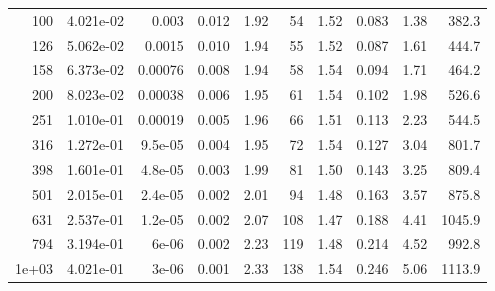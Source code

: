 \begin{tabular}{rrrrrrrrrr}
100 & 4.021e-02 & 0.003 & 0.012 & 1.92 & 54 & 1.52 & 0.083 & 1.38 & 382.3 \\
126 & 5.062e-02 & 0.0015 & 0.010 & 1.94 & 55 & 1.52 & 0.087 & 1.61 & 444.7 \\
158 & 6.373e-02 & 0.00076 & 0.008 & 1.94 & 58 & 1.54 & 0.094 & 1.71 & 464.2 \\
200 & 8.023e-02 & 0.00038 & 0.006 & 1.95 & 61 & 1.54 & 0.102 & 1.98 & 526.6 \\
251 & 1.010e-01 & 0.00019 & 0.005 & 1.96 & 66 & 1.51 & 0.113 & 2.23 & 544.5 \\
316 & 1.272e-01 & 9.5e-05 & 0.004 & 1.95 & 72 & 1.54 & 0.127 & 3.04 & 801.7 \\
398 & 1.601e-01 & 4.8e-05 & 0.003 & 1.99 & 81 & 1.50 & 0.143 & 3.25 & 809.4 \\
501 & 2.015e-01 & 2.4e-05 & 0.002 & 2.01 & 94 & 1.48 & 0.163 & 3.57 & 875.8 \\
631 & 2.537e-01 & 1.2e-05 & 0.002 & 2.07 & 108 & 1.47 & 0.188 & 4.41 & 1045.9 \\
794 & 3.194e-01 & 6e-06 & 0.002 & 2.23 & 119 & 1.48 & 0.214 & 4.52 & 992.8 \\
1e+03 & 4.021e-01 & 3e-06 & 0.001 & 2.33 & 138 & 1.54 & 0.246 & 5.06 & 1113.9 \\
\bottomrule
\end{tabular}
